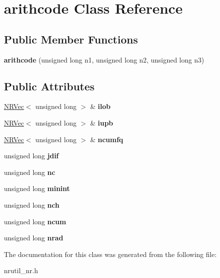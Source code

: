 \hypertarget{classarithcode}{}\section{arithcode Class Reference}
\label{classarithcode}
\subsection*{Public Member Functions}
\begin{DoxyCompactItemize}
\item 
\hypertarget{classarithcode_a3440b8d7a8b101681bc386f982bd92cb}{}\label{classarithcode_a3440b8d7a8b101681bc386f982bd92cb} 
{\bfseries arithcode} (unsigned long n1, unsigned long n2, unsigned long n3)
\end{DoxyCompactItemize}
\subsection*{Public Attributes}
\begin{DoxyCompactItemize}
\item 
\hypertarget{classarithcode_ac9a044ea0598b6f648ad4870f33d9d18}{}\label{classarithcode_ac9a044ea0598b6f648ad4870f33d9d18} 
\hyperlink{class_n_r_vec}{N\+R\+Vec}$<$ unsigned long $>$ \& {\bfseries ilob}
\item 
\hypertarget{classarithcode_af7c423f14a05b50f4f8dd656fa3660cc}{}\label{classarithcode_af7c423f14a05b50f4f8dd656fa3660cc} 
\hyperlink{class_n_r_vec}{N\+R\+Vec}$<$ unsigned long $>$ \& {\bfseries iupb}
\item 
\hypertarget{classarithcode_ae1966ac0bde27c0ada1bc025632054e6}{}\label{classarithcode_ae1966ac0bde27c0ada1bc025632054e6} 
\hyperlink{class_n_r_vec}{N\+R\+Vec}$<$ unsigned long $>$ \& {\bfseries ncumfq}
\item 
\hypertarget{classarithcode_a271bde4d35b6613bdcae4060007221fd}{}\label{classarithcode_a271bde4d35b6613bdcae4060007221fd} 
unsigned long {\bfseries jdif}
\item 
\hypertarget{classarithcode_a7c5f805d81735fb362c8bb317753737c}{}\label{classarithcode_a7c5f805d81735fb362c8bb317753737c} 
unsigned long {\bfseries nc}
\item 
\hypertarget{classarithcode_a34e73f5416ac3d861722215a987c3554}{}\label{classarithcode_a34e73f5416ac3d861722215a987c3554} 
unsigned long {\bfseries minint}
\item 
\hypertarget{classarithcode_ad687412f244bd2ed9daf154934a1594c}{}\label{classarithcode_ad687412f244bd2ed9daf154934a1594c} 
unsigned long {\bfseries nch}
\item 
\hypertarget{classarithcode_af5af3b7b8db9b90a1038d97c30c5bdf9}{}\label{classarithcode_af5af3b7b8db9b90a1038d97c30c5bdf9} 
unsigned long {\bfseries ncum}
\item 
\hypertarget{classarithcode_a01f26d81945f369b49a532a419c9e4e2}{}\label{classarithcode_a01f26d81945f369b49a532a419c9e4e2} 
unsigned long {\bfseries nrad}
\end{DoxyCompactItemize}


The documentation for this class was generated from the following file\+:\begin{DoxyCompactItemize}
\item 
nrutil\+\_\+nr.\+h\end{DoxyCompactItemize}
